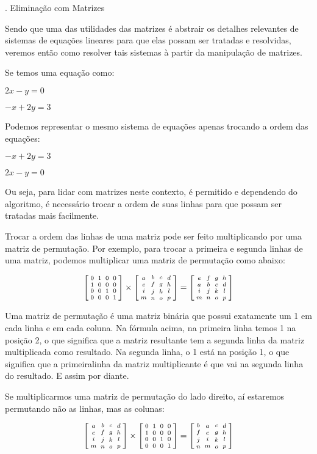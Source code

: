 {\tenbold{}. Eliminação com Matrizes}

Sendo que uma das utilidades das matrizes é abstrair os detalhes
relevantes de sistemas de equações lineares para que elas possam ser
tratadas e resolvidas, veremos então como resolver tais sistemas à
partir da manipulação de matrizes.

Se temos uma equação como:

$2x-y=0$

$-x+2y=3$

Podemos representar o mesmo sistema de equações apenas trocando a
ordem das equações:

$-x+2y=3$

$2x-y=0$

Ou seja, para lidar com matrizes neste contexto, é permitido e
dependendo do algoritmo, é necessário trocar a ordem de suas linhas
para que possam ser tratadas mais facilmente.

Trocar a ordem das linhas de uma matriz pode ser feito multiplicando
por uma matriz de permutação. Por exemplo, para trocar a primeira e
segunda linhas de uma matriz, podemos multiplicar uma matriz de
permutação como abaixo:

$$
\left[{{0\atop 1}\atop{0\atop 0}}
{{1\atop 0}\atop{0\atop 0}}
{{0\atop 0}\atop{1\atop 0}}
{{0\atop 0}\atop{0\atop 1}}
\right]\times
\left[{{a\atop e}\atop{i\atop m}}
{{b\atop f}\atop{j\atop n}}
{{c\atop g}\atop{k\atop o}}
{{d\atop h}\atop{l\atop p}}
\right]=
\left[{{e\atop a}\atop{i\atop m}}
{{f\atop b}\atop{j\atop n}}
{{g\atop c}\atop{k\atop o}}
{{h\atop d}\atop{l\atop p}}
\right]
$$

Uma matriz de permutação é uma matriz binária que possui exatamente um
1 em cada linha e em cada coluna. Na fórmula acima, na primeira linha
temos 1 na posição 2, o que significa que a matriz resultante tem a
segunda linha da matriz multiplicada como resultado. Na segunda linha,
o 1 está na posição 1, o que significa que a primeiralinha da matriz
multiplicante é que vai na segunda linha do resultado. E assim por
diante.

Se multiplicarmos uma matriz de permutação do lado direito, aí
estaremos permutando não as linhas, mas as colunas:

$$
\left[{{a\atop e}\atop{i\atop m}}
{{b\atop f}\atop{j\atop n}}
{{c\atop g}\atop{k\atop o}}
{{d\atop h}\atop{l\atop p}}
\right]\times
\left[{{0\atop 1}\atop{0\atop 0}}
{{1\atop 0}\atop{0\atop 0}}
{{0\atop 0}\atop{1\atop 0}}
{{0\atop 0}\atop{0\atop 1}}
\right]=
\left[{{b\atop f}\atop{j\atop n}}
{{a\atop e}\atop{i\atop m}}
{{c\atop g}\atop{k\atop o}}
{{d\atop h}\atop{l\atop p}}
\right]
$$

